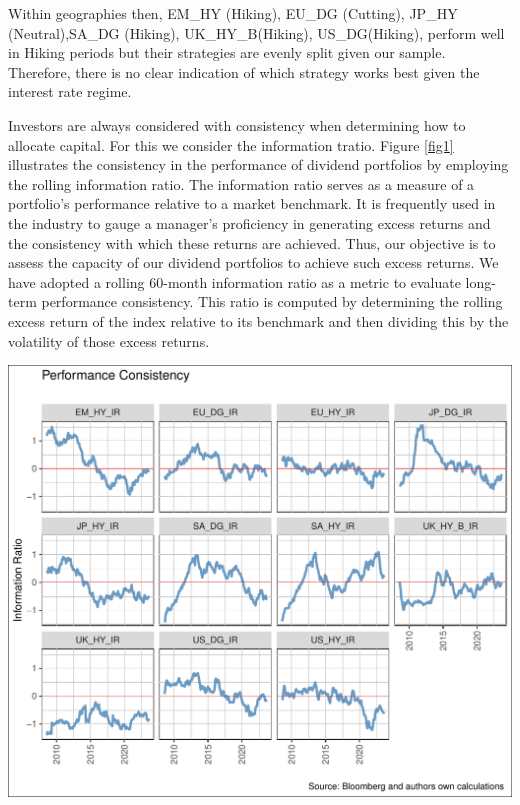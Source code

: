 \documentclass[12pt,preprint, authoryear]{elsarticle}
\let\origfigure\figure
\let\endorigfigure\endfigure
\renewenvironment{figure}[1][2] {
    \expandafter\origfigure\expandafter[H]
} {
    \endorigfigure
}
\numberwithin{equation}{section}
\numberwithin{figure}{section}
\numberwithin{table}{section}
\begin{document}
Within geographies then, EM\_HY (Hiking), EU\_DG (Cutting), JP\_HY
(Neutral),SA\_DG (Hiking), UK\_HY\_B(Hiking), US\_DG(Hiking), perform
well in Hiking periods but their strategies are evenly split given our
sample. Therefore, there is no clear indication of which strategy works
best given the interest rate regime.

Investors are always considered with consistency when determining how to
allocate capital. For this we consider the information tratio. Figure
\ref{fig1} illustrates the consistency in the performance of dividend
portfolios by employing the rolling information ratio. The information
ratio serves as a measure of a portfolio's performance relative to a
market benchmark. It is frequently used in the industry to gauge a
manager's proficiency in generating excess returns and the consistency
with which these returns are achieved. Thus, our objective is to assess
the capacity of our dividend portfolios to achieve such excess returns.
We have adopted a rolling 60-month information ratio as a metric to
evaluate long-term performance consistency. This ratio is computed by
determining the rolling excess return of the index relative to its
benchmark and then dividing this by the volatility of those excess
returns.

\begin{figure}[H]

\includegraphics{Much_Ado_About_Dividends_files/figure-latex/unnamed-chunk-1-1} \hfill{}

\caption{Rolling 3 Year Returns \label{fig1}}\label{fig:unnamed-chunk-1}
\end{figure}
\end{document}
